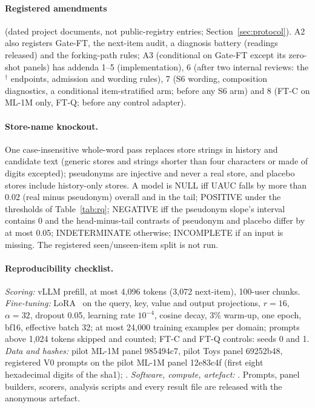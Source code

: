 \paragraph{Registered amendments}\label{app:prereg}\label{app:pseudonym}\label{app:repro}
(dated project documents, not public-registry entries; Section~\ref{sec:protocol}). A2 also registers Gate-FT, the next-item audit,
a diagnosis battery (readings released) and the forking-path rules; A3 (conditional on Gate-FT except its zero-shot panels) has
addenda 1--5 (implementation),
6 (after two internal reviews: the $^\dagger$ endpoints, admission and wording rules), 7 (S6 wording, composition diagnostics, a
conditional item-stratified arm; before any S6 arm) and 8 (FT-C on ML-1M only, FT-Q; before any control adapter).

\paragraph{Store-name knockout.}
One case-insensitive whole-word pass replaces store strings in history and candidate text (generic stores and strings shorter than
four characters or made of digits excepted); pseudonyms are injective and never a real store, and placebo stores include history-only
stores. A model is NULL iff UAUC falls by more than 0.02 (real minus
pseudonym) overall and in the tail; POSITIVE under the thresholds of Table~\ref{tab:rq}; NEGATIVE iff the pseudonym slope's interval
contains 0 and the head-minus-tail contrasts of pseudonym and placebo differ by at most 0.05; INDETERMINATE otherwise; INCOMPLETE if
an input is missing. The registered seen/unseen-item split is not run.

\paragraph{Reproducibility checklist.}
\emph{Scoring:} vLLM prefill, at most 4,096 tokens (3,072 next-item), 100-user chunks. \emph{Fine-tuning:} LoRA~\citep{hu2022lora} on
the query, key, value and output projections, $r{=}16$, $\alpha{=}32$, dropout 0.05, learning rate $10^{-4}$, cosine decay, 3\%
warm-up, one epoch, bf16, effective batch 32; at most 24,000 training examples per domain; prompts above 1,024 tokens skipped and
counted; FT-C and FT-Q controls: seeds 0 and 1. \emph{Data and hashes:} pilot ML-1M panel 985494c7, pilot Toys panel 69252b48,
registered V0 prompts on the pilot ML-1M panel 12e83c4f (first eight hexadecimal digits of the sha1); .
\emph{Software, compute, artefact:} . Prompts, panel
builders, scorers, analysis scripts and every result file are released with the anonymous artefact.
